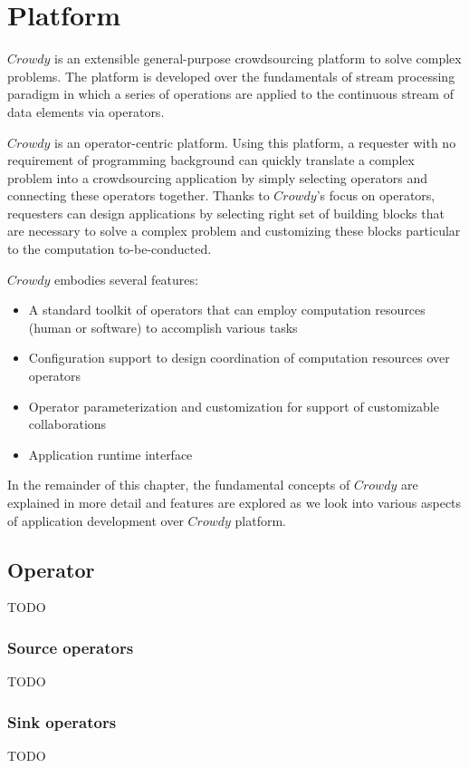 \chapter{Platform}
\label{chap:platform}

$Crowdy$ is an extensible general-purpose crowdsourcing platform to solve 
complex problems. The platform is developed over the fundamentals of stream 
processing paradigm in which a series of operations are applied to the continuous 
stream of data elements via operators.

$Crowdy$ is an operator-centric platform. Using this platform, a requester with no 
requirement of programming background can quickly translate a complex problem into 
a crowdsourcing application by simply selecting operators and connecting these operators 
together. Thanks to $Crowdy$'s focus on operators, requesters can design applications 
by selecting right set of building blocks that are necessary to solve a complex problem 
and customizing these blocks particular to the computation to-be-conducted.

$Crowdy$ embodies several features:
\begin{itemize}
	\item A standard toolkit of operators that can employ computation resources 
	(human or software) to accomplish various tasks
	\item Configuration support to design coordination of computation resources 
	over operators
	\item Operator parameterization and customization for support of customizable 
	collaborations
	\item Application runtime interface
\end{itemize}

In the remainder of this chapter, the fundamental concepts of $Crowdy$ are explained 
in more detail and features are explored as we look into various aspects of application 
development over $Crowdy$ platform.

\section{Operator}
TODO

\subsection{Source operators}
TODO

\subsection{Sink operators}
TODO

